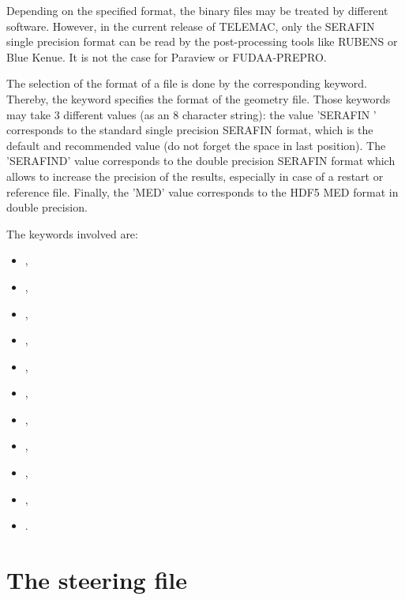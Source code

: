 Depending on the specified format, the binary files may be treated by different
software. However, in the current release of TELEMAC, only the SERAFIN single
precision format can be read by the post-processing tools like RUBENS
or Blue Kenue.
It is not the case for Paraview or FUDAA-PREPRO.

The selection of the format of a file is done by the corresponding keyword.
Thereby, the keyword  specifies the format of the
geometry file. Those keywords may take 3 different values (as an 8 character
string): the value 'SERAFIN ' corresponds to the standard single precision
SERAFIN format, which is the default and recommended value (do not forget the
space in last position). The 'SERAFIND' value corresponds to the double
precision SERAFIN format which allows to increase the precision of the results,
especially in case of a restart or reference file. Finally, the 'MED' value
corresponds to the HDF5 MED format in double precision.

The keywords involved are:

\begin{itemize}
\item {},

\item {},

\item {},

\item {},

\item {},

\item {},

\item {},

\item {},

\item {},

\item {},

\item {}.
\end{itemize}

\section{The steering file}

